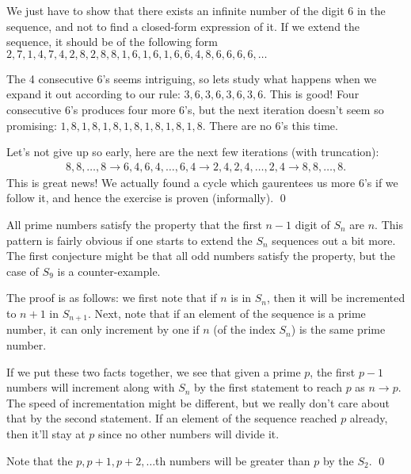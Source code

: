 \setcounter{Exercise}{5}
\begin{Exercise}
We just have to show that there exists an infinite number of the digit 6 in the sequence, and not to find a closed-form expression of it. If we extend the sequence, it should be of the following form $2,7,1,4,7,4,2,8,2,8,8,1,6,1,6,1,6,6,4,8,6,6,6,6,\ldots$ 

The 4 consecutive 6's seems intriguing, so lets study what happens when we expand it out according to our rule: $3,6,3,6,3,6,3,6$. 
This is good! Four consecutive 6's produces four more 6's, but the next iteration doesn't seem so promising: $1,8,1,8,1,8,1,8,1,8,1,8,1,8$. There are no 6's this time. 

Let's not give up so early, here are the next few iterations (with truncation): 
\begin{align}
8,8,\ldots, 8 \rightarrow 6,4,6,4,\ldots,6,4 \rightarrow 2,4,2,4,\ldots, 2,4 \rightarrow 8,8,\ldots, 8. 
\end{align}
This is great news! We actually found a cycle which gaurentees us more 6's if we follow it, and hence the exercise is proven (informally). \qed
\end{Exercise}

\begin{Exercise}
All prime numbers satisfy the property that the first $n-1$ digit of $S_n$ are $n$. This pattern is fairly obvious if one
starts to extend the $S_n$ sequences out a bit more. The first conjecture might be that all odd numbers satisfy the property,
but the case of $S_9$ is a counter-example. 

The proof is as follows: we first note that if $n$ is in $S_n$, then it will be incremented to $n+1$ in $S_{n+1}$. 
Next, note that if an element of the sequence is a prime number, it can only increment by one if $n$ (of the index $S_n$)
 is the same prime number.

If we put these two facts together, we see that given a prime $p$, the first $p-1$ numbers will increment along with $S_n$ by
the first statement to reach $p$ as $n \rightarrow p$. 
The speed of incrementation might be different, but we really don't care about that by the second statement. 
If an element of the sequence reached $p$ already, then it'll stay at $p$ since no other numbers will divide it.

Note that the $p, p+1, p+2, \ldots$th numbers will be greater than $p$ by the $S_2$. \qed
\end{Exercise}

